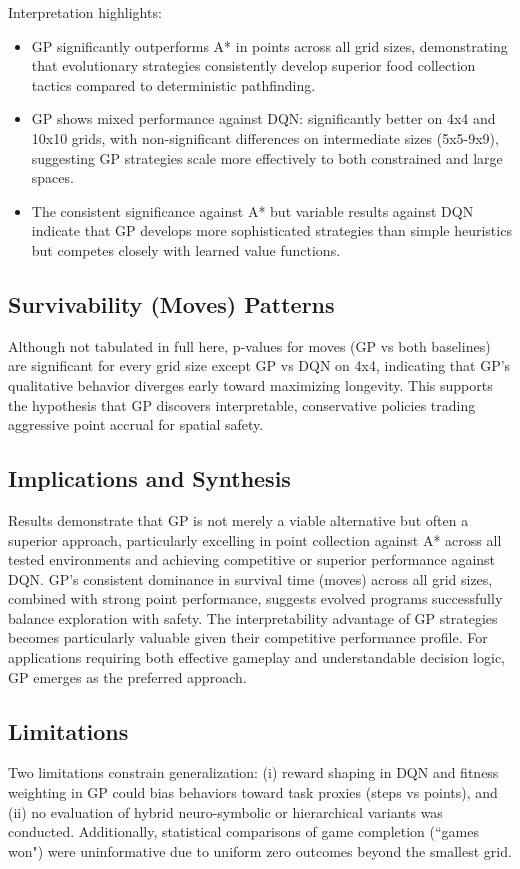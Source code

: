 \documentclass[a4paper,12pt]{article}
\begin{document}
Interpretation highlights:
\begin{itemize}
   \item GP significantly outperforms A* in points across all grid sizes, demonstrating that evolutionary strategies consistently develop superior food collection tactics compared to deterministic pathfinding.
   \item GP shows mixed performance against DQN: significantly better on 4x4 and 10x10 grids, with non-significant differences on intermediate sizes (5x5-9x9), suggesting GP strategies scale more effectively to both constrained and large spaces.
   \item The consistent significance against A* but variable results against DQN indicate that GP develops more sophisticated strategies than simple heuristics but competes closely with learned value functions.
\end{itemize}

\subsection{Survivability (Moves) Patterns}
Although not tabulated in full here, p-values for moves (GP vs both baselines) are significant for every grid size except GP vs DQN on 4x4, indicating that GP's qualitative behavior diverges early toward maximizing longevity. This supports the hypothesis that GP discovers interpretable, conservative policies trading aggressive point accrual for spatial safety.

\subsection{Implications and Synthesis}
Results demonstrate that GP is not merely a viable alternative but often a superior approach, particularly excelling in point collection against A* across all tested environments and achieving competitive or superior performance against DQN. GP's consistent dominance in survival time (moves) across all grid sizes, combined with strong point performance, suggests evolved programs successfully balance exploration with safety. The interpretability advantage of GP strategies becomes particularly valuable given their competitive performance profile. For applications requiring both effective gameplay and understandable decision logic, GP emerges as the preferred approach.

\subsection{Limitations}
Two limitations constrain generalization: (i) reward shaping in DQN and fitness weighting in GP could bias behaviors toward task proxies (steps vs points), and (ii) no evaluation of hybrid neuro-symbolic or hierarchical variants was conducted. Additionally, statistical comparisons of game completion (``games won") were uninformative due to uniform zero outcomes beyond the smallest grid.
\end{document}
